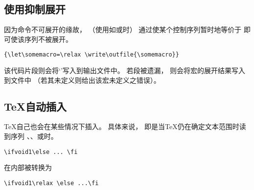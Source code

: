 \documentclass{book}
\begin{document}
\subsection{使用抑制展开}

因为命令不可展开的缘故，
（使用如或时）
通过使某个控制序列暂时地等价于
即可使该序列不被展开。
\begin{verbatim}
{\let\somemacro=\relax \write\outfile{\somemacro}}
\end{verbatim}
该代码片段则会将`'写入到输出文件中。
若段被遗漏，
则会将宏的展开结果写入到文件中
（若其未定义则给出该宏未定义之错误）。

\subsection{{\TeX}自动插入}
\label{bump:relax}

{\TeX}自己也会在某些情况下插入。
具体来说，
即是当{\TeX}仍在确定文本范围时读到序列
、、或时。
\begin{example}
\begin{verbatim}
\ifvoid1\else ... \fi
\end{verbatim}
在内部被转换为
\begin{verbatim}
\ifvoid1\relax \else ...\fi
\end{verbatim}
\end{example}
\end{document}
